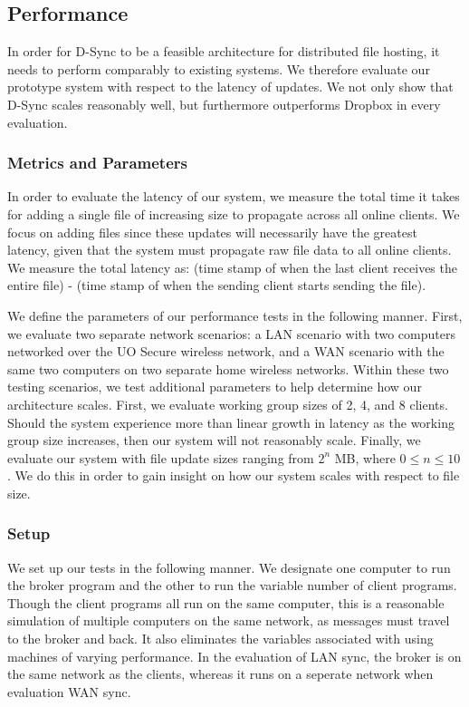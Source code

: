 \subsection{Performance}
\label{evaluation.performance}
In order for D-Sync to be a feasible architecture
for distributed file hosting, it needs to perform comparably
to existing systems.
We therefore evaluate our prototype system with respect
to the latency of updates.
We not only show that D-Sync scales reasonably well,
but furthermore outperforms Dropbox in every evaluation.

\subsubsection{Metrics and Parameters}
In order to evaluate the latency of our system,
we measure the total time it takes for adding a single file of 
increasing size to propagate across all online clients.
We focus on adding files since these updates will necessarily
have the greatest latency, given that the system
must propagate raw file data to all online clients.
We measure the total latency as: (time stamp of when the last client receives
the entire file) - (time stamp of when the sending client starts sending the file).

We define the parameters of our performance tests in the following manner.
First, we evaluate two separate network scenarios: a LAN scenario with
two computers networked over the UO Secure wireless network,
and a WAN scenario with the same two computers on two separate home
wireless networks. 
Within these two testing scenarios,
we test additional parameters to help determine how our architecture scales.
First, we evaluate working group sizes of 2, 4, and 8 clients.
Should the system experience more than linear growth in latency
as the working group size increases, then our system will not reasonably scale.
Finally, we evaluate our system with file update sizes ranging
from $2^n$ MB, where $0 \leq n \leq 10$.
We do this in order to gain insight on how our system scales
with respect to file size.

\subsubsection{Setup}
We set up our tests in the following manner. We designate one
computer to run the broker program
and the other to run the variable number of client programs.
Though the client programs all run on the same computer,
this is a reasonable simulation of multiple computers on the same
network, as messages must travel to the broker and back. It also
eliminates the variables associated with using machines of varying
performance. In the evaluation of LAN sync, the broker is on the same
network as the clients, whereas it runs on a seperate network when
evaluation WAN sync.

